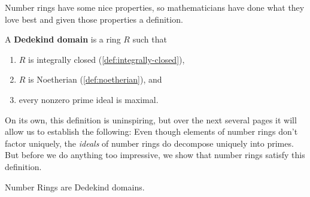 Number rings have some nice properties, so mathematicians have done what they love best and given those properties a definition.

\begin{definition}
    \label{def:dedekin-domain}
    A \textbf{Dedekind domain} is a ring $R$ such that
    \begin{enumerate}
        \item $R$ is integrally closed (\autoref{def:integrally-closed}),
        \item $R$ is Noetherian (\autoref{def:noetherian}), and
        \item every nonzero prime ideal is maximal.
    \end{enumerate}
\end{definition}

On its own, this definition is uninspiring, but over the next several pages it will allow us to establish the following: Even though elements of number rings don't factor uniquely, the \emph{ideals} of number rings do decompose uniquely into primes. But before we do anything too impressive, we show that number rings satisfy this definition.

\begin{theorem}
    Number Rings are Dedekind domains.
\end{theorem}

